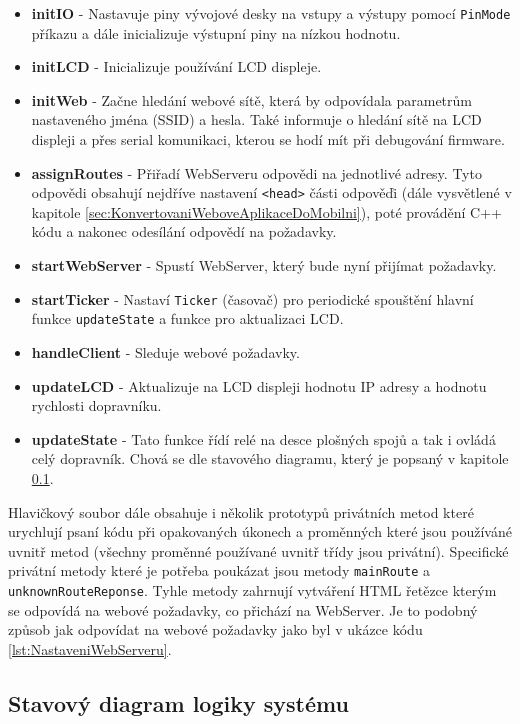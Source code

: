 \begin{itemize}
	\item \textbf{initIO} - Nastavuje piny vývojové desky na vstupy a výstupy pomocí \texttt{PinMode} příkazu a dále inicializuje výstupní piny na nízkou hodnotu.
	\item \textbf{initLCD} - Inicializuje používání LCD displeje.
	\item \textbf{initWeb} - Začne hledání webové sítě, která by odpovídala parametrům nastaveného jména (SSID) a hesla. Také informuje o hledání sítě na LCD displeji a přes serial komunikaci, kterou se hodí mít při debugování firmware.
	\item \textbf{assignRoutes} - Přiřadí WebServeru odpovědi na jednotlivé adresy. Tyto odpovědi obsahují nejdříve nastavení \texttt{<head>} části odpověďi (dále vysvětlené v kapitole \ref{sec:KonvertovaniWeboveAplikaceDoMobilni}), poté provádění C++ kódu a nakonec odesílání odpovědí na požadavky.
	\item \textbf{startWebServer} - Spustí WebServer, který bude nyní přijímat požadavky.
	\item \textbf{startTicker} - Nastaví \texttt{Ticker} (časovač) pro periodické spouštění hlavní funkce \texttt{updateState} a funkce pro aktualizaci LCD.
	\item \textbf{handleClient} - Sleduje webové požadavky.
	\item \textbf{updateLCD} - Aktualizuje na LCD displeji hodnotu IP adresy a hodnotu rychlosti dopravníku.
	\item \textbf{updateState} - Tato funkce řídí relé na desce plošných spojů a tak i ovládá celý dopravník. Chová se dle stavového diagramu, který je popsaný v kapitole \ref{sec:UpdateStateStavovyDiagram}.
\end{itemize}

Hlavičkový soubor dále obsahuje i několik prototypů privátních metod které urychlují psaní kódu při opakovaných úkonech a proměnných které jsou používáné uvnitř metod (všechny proměnné používané uvnitř třídy jsou privátní). Specifické privátní metody které je potřeba poukázat jsou metody \texttt{mainRoute} a \texttt{unknownRouteReponse}. Tyhle metody zahrnují vytváření HTML řetězce kterým se odpovídá na webové požadavky, co přichází na WebServer. Je to podobný způsob jak odpovídat na webové požadavky jako byl v ukázce kódu \ref{lst:NastaveniWebServeru}.

\subsection{Stavový diagram logiky systému}\label{sec:UpdateStateStavovyDiagram}


